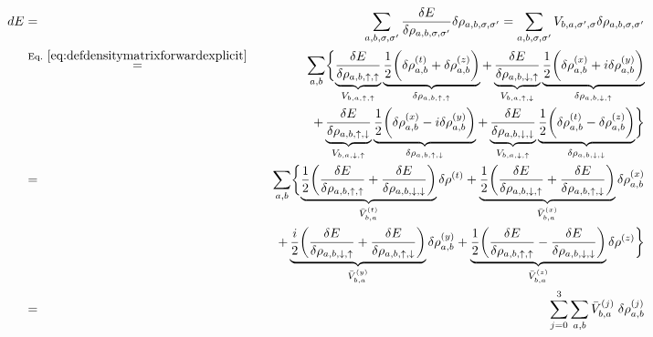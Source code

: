 \documentclass[11pt,a4paper]{report}
\begin{document}
\begin{eqnarray}
dE&=&
\sum_{a,b,\sigma,\sigma'}
\frac{\delta E}{\delta\rho_{a,b,\sigma,\sigma'}}
\delta\rho_{a,b,\sigma,\sigma'}
=\sum_{a,b,\sigma,\sigma'}V_{b,a,\sigma',\sigma}\delta\rho_{a,b,\sigma,\sigma'}
\nonumber\\
&\eqrel{eq:defdensitymatrixforwardexplicit}{=}&
\sum_{a,b}\biggl\lbrace
\underbrace{
\frac{{\delta}E}{{\delta}\rho_{a,b,\uparrow,\uparrow}}
}_{V_{b,a,\uparrow,\uparrow}}
\underbrace{
\frac{1}{2}\biggl({\delta}\rho^{(t)}_{a,b}+{\delta}\rho^{(z)}_{a,b}\biggr)
}_{\delta\rho_{a,b,\uparrow,\uparrow}}
+
\underbrace{
\frac{{\delta}E}{\delta\rho_{a,b,\downarrow,\uparrow}}
}_{V_{b,a,\uparrow,\downarrow}}
\underbrace{
\frac{1}{2}\biggl({\delta}\rho^{(x)}_{a,b}+i{\delta}\rho^{(y)}_{a,b}\biggr)
}_{\delta\rho_{a,b,\downarrow,\uparrow}}
\nonumber\\
&&\hspace{0.5cm}+
\underbrace{
\frac{{\delta}E}{{\delta}\rho_{a,b,\uparrow,\downarrow}}
}_{V_{b,a,\downarrow,\uparrow}}
\underbrace{
\frac{1}{2}\biggl({\delta}\rho^{(x)}_{a,b}-i{\delta}\rho^{(y)}_{a,b}\biggr)
}_{\delta\rho_{a,b,\uparrow,\downarrow}}
+
\underbrace{
\frac{{\delta}E}{{\delta}\rho_{a,b,\downarrow,\downarrow}}
}_{V_{b,a,\downarrow,\uparrow}}
\underbrace{
\frac{1}{2}\biggl({\delta}\rho^{(t)}_{a,b}-{\delta}\rho^{(z)}_{a,b}\biggr)
}_{\delta\rho_{a,b,\downarrow,\downarrow}}
\biggr\rbrace
\nonumber\\
&=&
\sum_{a,b}\biggl\lbrace
\underbrace{
\frac{1}{2}
\biggl(\frac{\delta{E}}{\delta\rho_{a,b,\uparrow,\uparrow}}
+\frac{\delta{E}}{\delta\rho_{a,b,\downarrow,\downarrow}}
\biggr)
}_{\bar{V}_{b,a}^{(t)}}
\delta\rho^{(t)}
+
\underbrace{
\frac{1}{2}
\biggl(\frac{{\delta}E}{{\delta}\rho_{a,b,\downarrow,\uparrow}}
+\frac{{\delta}E}{\delta\rho_{a,b,\uparrow,\downarrow}}\biggr)
}_{\bar{V}_{b,a}^{(x)}}
{\delta}\rho^{(x)}_{a,b}
\nonumber\\
&&\hspace{0.5cm}+
\underbrace{
\frac{i}{2}
\biggl(\frac{{\delta}E}{{\delta}\rho_{a,b,\downarrow,\uparrow}}
+\frac{{\delta}E}{{\delta}\rho_{a,b,\uparrow,\downarrow}}\biggr)
}_{\bar{V}_{b,a}^{(y)}}
{\delta}\rho^{(y)}_{a,b}
+
\underbrace{
\frac{1}{2}
\biggl(\frac{\delta{E}}{\delta\rho_{a,b,\uparrow,\uparrow}}
-\frac{\delta{E}}{\delta\rho_{a,b,\downarrow,\downarrow}}\biggr)
}_{\bar{V}_{b,a}^{(z)}}
{\delta}\rho^{(z)}
\biggr\rbrace
\nonumber\\
&=&\sum_{j=0}^3 \sum_{a,b}\bar{V}^{(j)}_{b,a}\;\delta\rho^{(j)}_{a,b}
\end{eqnarray}
\end{document}
